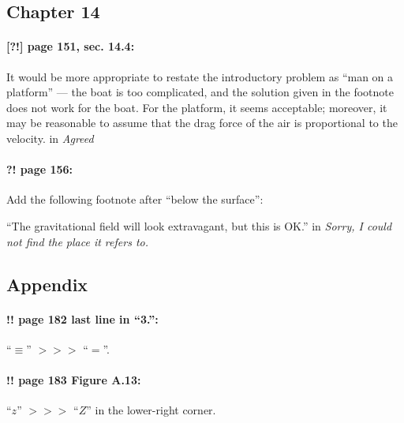 \documentclass[twoside]{article}
\begin{document}
\subsection*{Chapter 14}

\paragraph{[?!] page 151, sec. 14.4:} It would be more appropriate to restate the introductory problem as ``man on a platform'' — the boat is too complicated, and the solution given in the footnote does not work for the boat. For the platform, it seems acceptable; moreover, it may be reasonable to assume that the drag force of the air is proportional to the velocity.
 in {\it  Agreed} 

\paragraph{?! page 156:} Add the following footnote after ``below the surface'':

``The gravitational field will look extravagant, but this is OK.''
 in {\it  Sorry, I could not find the place it refers to.} 


\subsection*{Appendix}

\paragraph{!! page 182 last line in ``3.'':} ``$\equiv$'' $>\!>\!>$ ``$=$''.

\paragraph{!! page 183 Figure A.13:} ``$z$'' $>\!>\!>$ ``$Z$'' in the lower-right corner.
\end{document}
